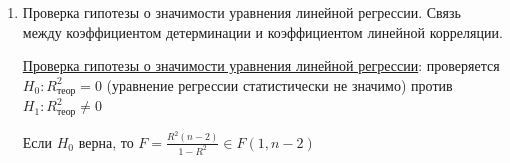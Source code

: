 \documentclass[12pt]{article}
\begin{document}
\begin{enumerate}
    \Defs $D(\hat \varepsilon) = \frac{1}{n} \sum_{i = 1}^n (\hat \varepsilon_i)^2$ - дисперсия остатков

    Так как $X = \hat X + \hat \varepsilon$, $\cov (\hat X, \hat \varepsilon) = 0$, то $D(X) = D(\hat X) + D(\hat \varepsilon) + 2\cov (\hat X, \hat \varepsilon) = D(\hat X) + D(\hat \varepsilon)$

    \begin{MyTheorem}
        \Ths $D(X) = D(\hat X) + D(\hat \varepsilon)$
    \end{MyTheorem}

    Очевидно, что качество модели будет тем лучше, чем меньше будет дисперсия остатков

    \Def Коэффициентом детерминации $R^2$ называется величина $R^2 = \frac{D(\hat X)}{D(X)}$ или $R^2 = 1 - \frac{D(\hat \varepsilon)}{D(X)}$

    \Notas Смысл $R^2$ - доля объясненной дисперсии, а $1 - R^2$ - доля необъясненной дисперсии

    Свойства: 

    \begin{enumerate}
        \item $0 \leq R^2 \leq 1$
        \item Если $R^2 = 1$, то $D(\hat \varepsilon) = 0 \Longrightarrow \hat \varepsilon_i = \overline{\hat \varepsilon_i} = 0$, то есть точки лежат строго на 
        линии регрессии, модель идеальна

        \item Если $R^2 = 0$, то $D(\hat X) = 0 \Longrightarrow \hat X = \overline{x}$, то есть получаем примитивную, ничего не объясняющую модель
    \end{enumerate}

    Чем больше $R^2$, тем лучше качество модели

    \item Проверка гипотезы о значимости уравнения линейной регрессии. Связь между коэффициентом детерминации и коэффициентом линейной корреляции.

    \hyperlink{linear_regression_hypothesis}{Проверка гипотезы о значимости уравнения линейной регрессии}: проверяется $H_0 : R^2_\text{теор} = 0$ (уравнение регрессии статистически не значимо) против $H_1 : R^2_\text{теор} \neq 0$

    \begin{MyTheorem}
        \Ths Если $H_0$ верна, то $F = \frac{R^2 (n - 2)}{1 - R^2} \in F(1, n - 2)$
    \end{MyTheorem}


\end{enumerate}
\end{document}
